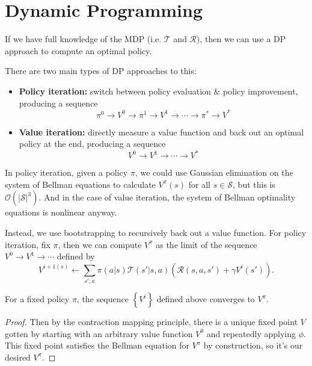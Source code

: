 \documentclass[twoside,10pt]{report}
\begin{document}
\section{Dynamic Programming}

If we have full knowledge of the MDP (i.e. $\mathcal{T}$ and $\mathcal{R}$), then we can use a DP approach to compute an optimal policy.

There are two main types of DP approaches to this:
\begin{itemize}
	\item \textbf{Policy iteration:} switch between policy evaluation \& policy improvement, producing a sequence
		\[
		\pi^{0} \to V^{0} \to \pi^{1}\to V^1 \to \cdots \to \pi^{*} \to V^{*}
		\] 
	\item \textbf{Value iteration:} directly measure a value function and back out an optimal policy at the end, producing a sequence
		\[
		V^{0} \to V^1 \to \cdots \to V^{*}
		\] 
\end{itemize}

In policy iteration, given a policy $\pi$, we could use Gaussian elimination on the system of Bellman equations to calculate $V^{\pi}(s)$ for all $s \in \mathcal{S}$, but this is $\mathcal{O}(|\mathcal{S}|^{3})$. And in the case of value iteration, the system of Bellman optimality equations is nonlinear anyway.

Instead, we use bootstrapping to recursively back out a value function. For policy iteration, fix $\pi$, then we can compute $V^{\pi}$ as the limit of the sequence $V^{0} \to V^1 \to \cdots$ defined by
\[
	V^{i+1(s)} \gets \sum_{s',a} \pi(a|s) \mathcal{T}(s'|s,a) \left( \mathcal{R}(s,a,s') + \gamma V^{i}(s') \right).
\] 

\begin{prop}
For a fixed policy $\pi$, the sequence $\left\{ V^{i} \right\}$ defined above converges to $V^{\pi}$.
\label{bellmanoperator}
\end{prop}
\begin{proof}
	Then by the contraction mapping principle, there is a unique fixed point $V$ gotten by starting with an arbitrary value function $V^{0}$ and repeatedly applying $\phi$. This fixed point satisfies the Bellman equation for $V^{\pi}$ by construction, so it's our desired $V^{\pi}$.
\end{proof}
\end{document}
